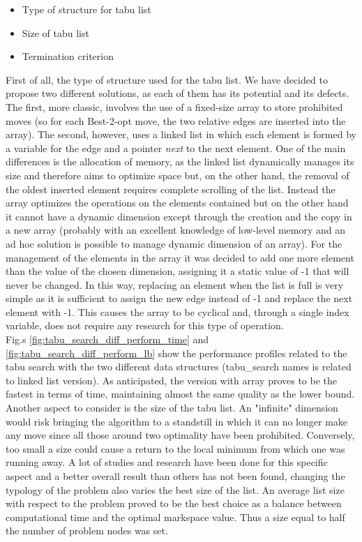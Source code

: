 \begin{itemize}
\item Type of structure for tabu list
\item Size of tabu list
\item Termination criterion
\end{itemize}

First of all, the type of structure used for the tabu list. We have decided to propose two different solutions, as each of them has its potential and its defects. The first, more classic, involves the use of a fixed-size array to store prohibited moves (so for each Best-2-opt move, the two relative edges are inserted into the array). The second, however, uses a linked list in which each element is formed by a variable for the edge and a pointer \textit{next} to the next element.
One of the main differences is the allocation of memory, as the linked list dynamically manages its size and therefore aims to optimize space but, on the other hand, the removal of the oldest inserted element requires complete scrolling of the list. Instead the array optimizes the operations on the elements contained but on the other hand it cannot have a dynamic dimension except through the creation and the copy in a new array (probably with an excellent knowledge of low-level memory and an ad hoc solution is possible to manage dynamic dimension of an array). For the management of the elements in the array it was decided to add one more element than the value of the chosen dimension, assigning it a static value of -1 that will never be changed. In this way, replacing an element when the list is full is very simple as it is sufficient to assign the new edge instead of -1 and replace the next element with -1. This causes the array to be cyclical and, through a single index variable, does not require any research for this type of operation.\\
Fig.s \ref{fig:tabu_search_diff_perform_time} and \ref{fig:tabu_search_diff_perform_lb} show the performance profiles related to the tabu search with the two different data structures (tabu\_search names is related to linked list version). As anticipated, the version with array proves to be the fastest in terms of time, maintaining almost the same quality as the lower bound. \\
Another aspect to consider is the size of the tabu list. An "infinite" dimension would risk bringing the algorithm to a standstill in which it can no longer make any move since all those around two optimality have been prohibited. Conversely, too small a size could cause a return to the local minimum from which one was running away. A lot of studies and research have been done for this specific aspect \cite{Nababan_2019, Tsubakitani1998} and a better overall result than others has not been found, changing the typology of the problem also varies the best size of the list. An average list size with respect to the problem proved to be the best choice as a balance between computational time and the optimal markspace value. Thus a size equal to half the number of problem nodes was set.\\
